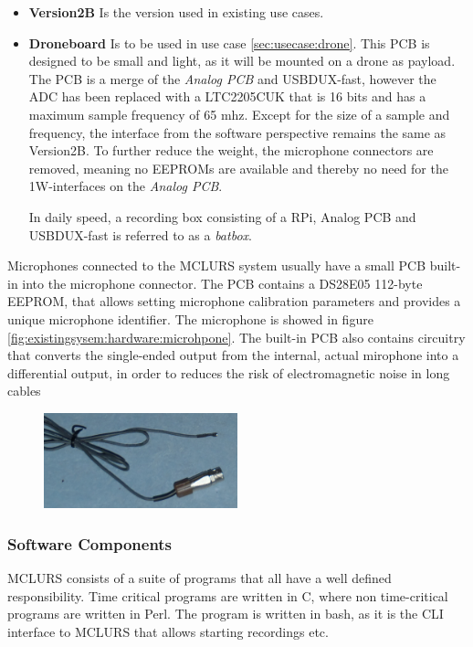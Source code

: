 \begin{itemize}
	\item \textbf{Version2B} Is the version used in existing use cases. 

	\item \textbf{Droneboard} Is to be used in use case \ref{sec:usecase:drone}. This PCB is designed to be small and light, as it will be mounted on a drone as payload. The PCB is a merge of the \textit{Analog PCB} and USBDUX-fast, however the ADC has been replaced with a LTC2205CUK\citep{ADC:LTC2205} that is 16 bits and has a maximum sample frequency of 65 mhz. Except for the size of a sample and frequency, the interface from the software perspective remains the same as Version2B. To further reduce the weight, the microphone connectors are removed, meaning no EEPROMs are available and thereby no need for the 1W-interfaces on the \textit{Analog PCB}.

In daily speed, a recording box consisting of a RPi, Analog PCB and USBDUX-fast is referred to as a \textit{batbox}.

\end{itemize}
Microphones connected to the MCLURS system usually have a small PCB built-in into the microphone connector. The PCB contains a DS28E05\citep{EEPROM:DS28E05} 112-byte EEPROM, that allows setting microphone calibration parameters and provides a unique microphone identifier. The microphone is showed in figure \ref{fig:existingsysem:hardware:microhpone}. The built-in PCB also contains circuitry that converts the single-ended output from the internal, actual mirophone into a differential output, in order to reduces the risk of electromagnetic noise in long cables

\begin{figure}[h!]
	\centering
	\includegraphics[width=0.5\textwidth]{figures/mclurs_microphone}
\end{figure}
\subsubsection{Software Components} \label{sec:existingsystem:software}
MCLURS consists of a suite of programs that all have a well defined responsibility. Time critical programs are written in C, where non time-critical programs are written in Perl.
The  program is written in bash, as it is the CLI interface to MCLURS that allows starting recordings etc.

